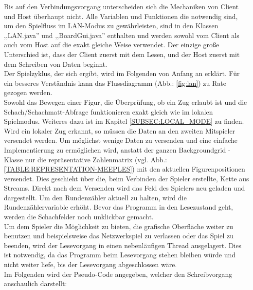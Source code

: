\documentclass[12pt,a4paper]{article}
\begin{document}
Bis auf den Verbindungsvorgang unterscheiden sich die Mechaniken von Client und Host überhaupt nicht. Alle Variablen und Funktionen die notwendig sind, um den Spielfluss im LAN-Modus zu gewährleisten, sind in den Klassen ,,LAN.java'' und ,,BoardGui.java'' enthalten und werden sowohl vom Client als auch vom Host auf die exakt gleiche Weise verwendet. Der einzige große Unterschied ist, dass der Client zuerst mit dem Lesen, und der Host zuerst mit dem Schreiben von Daten beginnt. \\
Der Spielzyklus, der sich ergibt, wird im Folgenden von Anfang an erklärt. Für ein besseres Verständnis kann das Flussdiagramm (Abb.: \ref{fig:lan}) zu Rate gezogen werden.\\
Sowohl das Bewegen einer Figur, die Überprüfung, ob ein Zug erlaubt ist und die Schach/Schachmatt-Abfrage funktionieren exakt gleich wie im lokalen Spielmodus. Weiteres dazu ist im Kapitel \ref{SUBSEC:LOCAL_MODE} zu finden.\\[2ex]
Wird ein lokaler Zug erkannt, so müssen die Daten an den zweiten Mitspieler versendet werden. Um möglichst wenige Daten zu versenden und eine einfache Implementierung zu ermöglichen wird, anstatt der ganzen Backgroundgrid - Klasse nur die repräsentative Zahlenmatrix (vgl. Abb.: \ref{TABLE:REPRESENTATION-MEEPLES}) mit den aktuellen Figurenpositionen versendet. Dies geschieht über die, beim Verbinden der Spieler erstellte, Kette aus Streams. Direkt nach dem Versenden wird das Feld des Spielers neu geladen und dargestellt. Um den Rundenzähler aktuell zu halten, wird die Rundenzählervariable erhöht. 
Bevor das Programm in den Lesezustand geht, werden die Schachfelder noch unklickbar gemacht.\\[2ex]
Um dem Spieler die Möglichkeit zu bieten, die grafische Oberfläche weiter zu benutzen und beispielsweise das Netzwerkspiel zu verlassen oder das Spiel zu beenden, wird der Lesevorgang in einen nebenläufigen Thread ausgelagert. Dies ist notwendig, da das Programm beim Lesevorgang stehen bleiben würde und nicht weiter liefe, bis der Lesevorgang abgeschlossen wäre.\\
Im Folgenden wird der Pseudo-Code angegeben, welcher den Schreibvorgang anschaulich darstellt:
\end{document}
